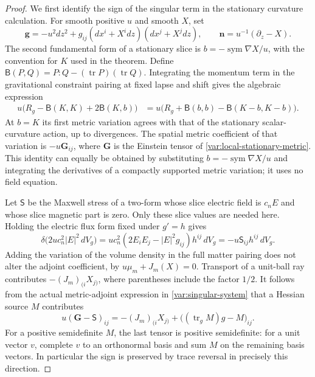 \begin{proof}
We first identify the sign of the singular term in the stationary
curvature calculation.  For smooth positive $u$ and smooth $X$, set
\begin{equation}\label{var:local-stationary-metric}
 \mathbf g=-u^2 dz^2+
       g_{ij}(dx^i+X^i dz)(dx^j+X^j dz),\qquad
 \mathbf n=u^{-1}(\partial_z-X).
\end{equation}
The second fundamental form of a stationary slice is
$b=-\operatorname{sym}\nabla X/u$, with the convention for $K$ used in
the theorem.  Define
$\mathsf B(P,Q)=P:Q-(\operatorname{tr}P)(\operatorname{tr}Q)$.
Integrating the momentum term in the gravitational constraint pairing
at fixed lapse and shift gives the algebraic expression
\begin{align}\label{var:stationary-action-identity}
 u\bigl(R_g-\mathsf B(K,K)+2\mathsf B(K,b)\bigr)
 &=u\bigl(R_g+\mathsf B(b,b)
                    -\mathsf B(K-b,K-b)\bigr).
\end{align}
At $b=K$ its first metric variation agrees with that of the stationary
scalar-curvature action, up to divergences.  The spatial metric
coefficient of that variation is $-u\mathbf G_{ij}$, where $\mathbf G$
is the Einstein tensor of \eqref{var:local-stationary-metric}.
This identity can equally be obtained by substituting
$b=-\operatorname{sym}\nabla X/u$ and integrating the derivatives of a
compactly supported metric variation; it uses no field equation.

Let $\mathsf S$ be the Maxwell stress of a two-form whose slice electric
field is $c_nE$ and whose slice magnetic part is zero.  Only these slice
values are needed here.  Holding the electric flux form fixed under
$g'=h$ gives
\begin{equation}\label{var:fixed-flux-stress}
 \delta\bigl(2u c_n^2|E|^2\,dV_g\bigr)
 =u c_n^2(2E_iE_j-|E|^2g_{ij})h^{ij}\,dV_g
 =-u\mathsf S_{ij}h^{ij}\,dV_g.
\end{equation}
Adding the variation of the volume density in the full matter pairing
does not alter the adjoint coefficient, by
$u\mu_m+J_m(X)=0$.  Transport of a unit-ball ray contributes
$-(J_m)_{(i}X_{j)}$, where parentheses include the factor $1/2$.
It follows from the actual metric-adjoint expression in
\eqref{var:singular-system} that a Hessian source $M$ contributes
\begin{equation}\label{var:stress-trace-reversal}
 u(\mathbf G-\mathsf S)_{ij}
 =-(J_m)_{(i}X_{j)}+
       \bigl((\operatorname{tr}_g M)g-M\bigr)_{ij}.
\end{equation}
For a positive semidefinite $M$, the last tensor is positive
semidefinite: for a unit vector $v$, complete $v$ to an orthonormal
basis and sum $M$ on the remaining basis vectors.  In particular the
sign is preserved by trace reversal in precisely this direction.


\end{proof}

